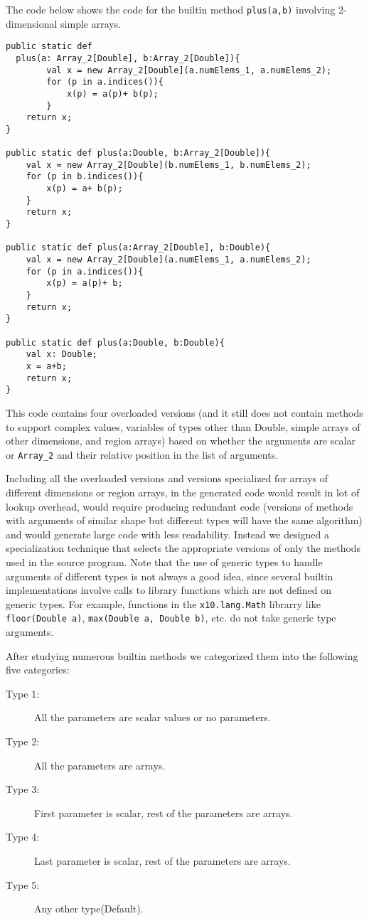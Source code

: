 The code below shows the \xten code for the \matlab builtin method
\verb|plus(a,b)| involving 2-dimensional simple arrays.

\noindent
\begin{lstlisting}[language=X10,numbers=none]
public static def 
  plus(a: Array_2[Double], b:Array_2[Double]){
		val x = new Array_2[Double](a.numElems_1, a.numElems_2);
		for (p in a.indices()){
			x(p) = a(p)+ b(p);
		}
  	return x;
}
	
public static def plus(a:Double, b:Array_2[Double]){
	val x = new Array_2[Double](b.numElems_1, b.numElems_2);
	for (p in b.indices()){
		x(p) = a+ b(p);
	}
	return x;
}
	
public static def plus(a:Array_2[Double], b:Double){
	val x = new Array_2[Double](a.numElems_1, a.numElems_2);
	for (p in a.indices()){
		x(p) = a(p)+ b;
	}
	return x;
}
	
public static def plus(a:Double, b:Double){
	val x: Double;
	x = a+b;
	return x;
}
\end{lstlisting}

This \xten code contains four overloaded versions (and it still does not
contain methods to support complex values, variables of types other than Double,
simple arrays of other dimensions, and region arrays) based 
on whether the arguments are scalar or \texttt{Array\_2} and their relative position
in the list of arguments. 

Including all the overloaded versions and versions specialized for arrays of
different dimensions or region arrays, in the generated \xten code would result
in lot of lookup overhead, would require producing redundant code (versions
of methods with arguments of similar shape but different types will have the
same algorithm) and would generate large code with less readability. Instead we
designed a specialization technique that selects the appropriate versions of
only the methods used in the source \matlab program. Note that the use of
generic types to handle arguments of different types is not always a good idea,
since several builtin implementations involve calls to \xten library functions
which are not defined on generic types. For example, functions in the
\texttt{x10.lang.Math} librarry like \texttt{floor(Double a)},
\texttt{max(Double a, Double b)}, etc. do not take generic type arguments. 

After studying numerous builtin methods we categorized them into the
following five categories:

\begin{description}
\item[Type 1:] All the parameters are scalar values or no parameters.
\item[Type 2:] All the parameters are arrays.
\item[Type 3:] First parameter is scalar, rest of the parameters are arrays.
\item[Type 4:] Last parameter is scalar, rest of the parameters are arrays.
\item[Type 5:] Any other type(Default).
\end{description}

